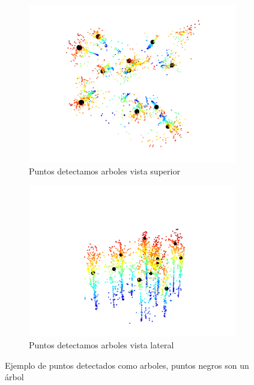 \begin{figure}[h]
  \begin{subfigure}{0.5\textwidth}
    \centering
    \includegraphics[width=0.8\linewidth]{imaxes/detecsup.png}
    \caption{Puntos detectamos arboles vista superior}
    \label{fig:last1}
  \end{subfigure}%
  \begin{subfigure}{0.5\textwidth}
    \centering
    \includegraphics[width=0.8\linewidth]{imaxes/deteclat.png}
    \caption{Puntos detectamos arboles vista lateral}
    \label{fig:last}
  \end{subfigure}
  \caption{Ejemplo de puntos detectados como arboles, puntos negros son un árbol}
  \label{fig:algo2}
\end{figure}

